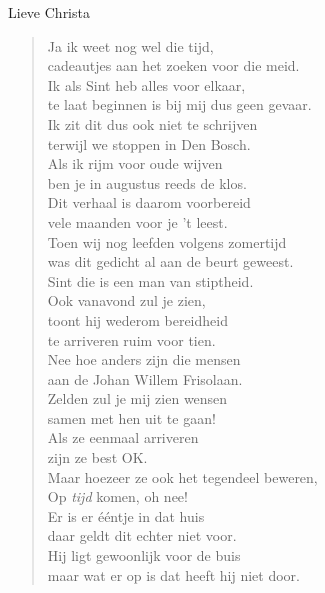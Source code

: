 \documentclass[12pt]{brief}
\date{12 augustus 2006}
\begin{document}
\begin{letter}{Lieve Christa}

\opening{}


\begin{verse}

Ja ik weet nog wel die tijd,\\
cadeautjes aan het zoeken voor die meid.\\
Ik als Sint heb alles voor elkaar,\\
te laat beginnen is bij mij dus geen gevaar.\\[1.5em]

Ik zit dit dus ook niet te schrijven\\
terwijl we stoppen in Den Bosch.\\
Als ik rijm voor oude wijven\\
ben je in augustus reeds de klos.\\[1.5em]

Dit verhaal is daarom voorbereid\\
vele maanden voor je 't leest.\\
Toen wij nog leefden volgens zomertijd\\
was dit gedicht al aan de beurt geweest.\\[1.5em]

Sint die is een man van stiptheid.\\
Ook vanavond zul je zien,\\
toont hij wederom bereidheid\\
te arriveren ruim voor tien.\\[1.5em]

Nee hoe anders zijn die mensen\\
aan de Johan Willem Frisolaan.\\
Zelden zul je mij zien wensen\\
samen met hen uit te gaan!\\[3.5em]

Als ze eenmaal arriveren\\
zijn ze best OK.\\
Maar hoezeer ze ook het tegendeel beweren,\\
Op \emph{tijd} komen, oh nee!\\[1.5em]

Er is er \'e\'entje in dat huis\\
daar geldt dit echter niet voor.\\
Hij ligt gewoonlijk voor de buis\\
maar wat er op is dat heeft hij niet door.\\[1.5em]


\end{verse}
\end{letter}
\end{document}
